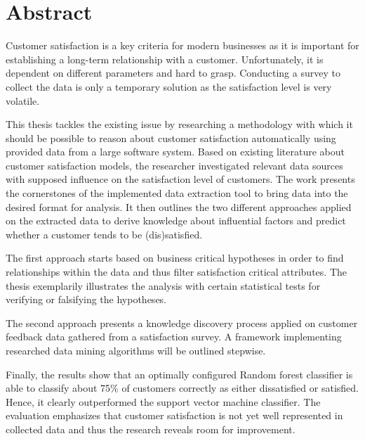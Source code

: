\chapter*{Abstract}

Customer satisfaction is a key criteria for modern businesses as it is important for establishing a long-term relationship with a customer. Unfortunately, it is dependent on different parameters and hard to grasp. Conducting a survey to collect the data is only a temporary solution as the satisfaction level is very volatile. 

This thesis tackles the existing issue by researching a methodology with which it should be possible to reason about customer satisfaction automatically using provided data from a large software system. Based on existing literature about customer satisfaction models, the researcher investigated relevant data sources with supposed influence on the satisfaction level of customers. The work presents the cornerstones of the implemented data extraction tool to bring data into the desired format for analysis. It then outlines the two different approaches applied on the extracted data to derive knowledge about influential factors and predict whether a customer tends to be (dis)satisfied. 

The first approach starts based on business critical hypotheses in order to find relationships within the data and thus filter satisfaction critical attributes. The thesis exemplarily illustrates the analysis with certain statistical tests for verifying or falsifying the hypotheses. 

The second approach presents a knowledge discovery process applied on customer feedback data gathered from a satisfaction survey. A framework implementing researched data mining algorithms will be outlined stepwise. 

Finally, the results show that an optimally configured Random forest classifier is able to classify about 75\% of customers correctly as either dissatisfied or satisfied. Hence, it clearly outperformed the support vector machine classifier. The evaluation emphasizes that customer satisfaction is not yet well represented in collected data and thus the research reveals room for improvement. 

